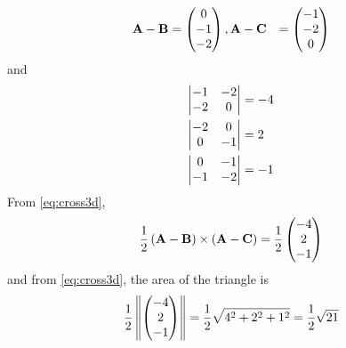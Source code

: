 
%
\begin{align}
  \mathbf{A}-\mathbf{B} &= \begin{pmatrix}0\\-1\\-2\end{pmatrix},
  \mathbf{A}-\mathbf{C} &= \begin{pmatrix}-1\\-2\\0\end{pmatrix}
\end{align}
and 
\begin{align}
  \begin{vmatrix}-1 & -2 \\-2 & 0\end{vmatrix} &= -4 \\
  \begin{vmatrix}-2 & 0 \\0 & -1\end{vmatrix} &= 2 \\
  \begin{vmatrix}0 & -1 \\-1 & -2\end{vmatrix} &= -1 \\
\end{align}
From   \eqref{eq:cross3d}, 
\begin{align}
  \frac{1}{2}\left(\mathbf{A} - \mathbf{B}\right) \times \left(\mathbf{A} - \mathbf{C}\right) = \frac{1}{2}\begin{pmatrix}-4\\2\\-1\end{pmatrix}
\end{align}
and from \eqref{eq:cross3d}, the area of the triangle is
\begin{align}
  \frac{1}{2}\left\lVert\begin{pmatrix}-4\\2\\-1\end{pmatrix}\right\rVert = \frac{1}{2}\sqrt{4^2+2^2+1^2} = \frac{1}{2}\sqrt{21}
\end{align}
